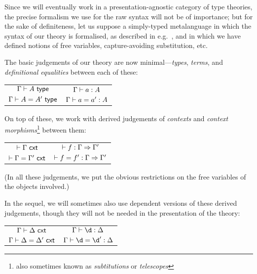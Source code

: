 \begin{para}
Since we will eventually work in a presentation-agnostic category of type theories, the precise formalism we use for the raw syntax will not be of importance; but for the sake of definiteness, let us suppose a simply-typed metalanguage in which the syntax of our theory is formalised, as described in e.g.\ \cite[6.1]{pitts:categorial-logic}, and in which we have defined notions of free variables, capture-avoiding substitution, etc.

The basic judgements of our theory are now minimal---\emph{types}, \emph{terms}, and \emph{definitional equalities} between each of these:
\end{para}
\begin{center}\begin{tabular}{@{\ }c@{\hskip 0.75in}c@{\ }}
$\Gamma \vdash A \ \mathsf{type} $ & $ \Gamma \vdash a:A $ \\ \rule{0pt}{3ex} 
$\Gamma \vdash A = A' \ \mathsf{type} $& $ \Gamma \vdash a = a' : A $ \\
\end{tabular}
\end{center}

On top of these, we work with derived judgements of \emph{contexts} and \emph{context morphisms}\footnote{also sometimes known as \emph{subtitutions} or \emph{telescopes}} between them:
\begin{center}\begin{tabular}{@{\ }c@{\hskip 0.75in}c@{\ }}
$\vdash \Gamma \ \mathsf{cxt}$ & $ \vdash  f : \Gamma \Rightarrow \Gamma' $  \\ \rule{0pt}{3ex} 
$\vdash \Gamma = \Gamma' \ \mathsf{cxt}$ &  $\vdash { f} = { f}' : \Gamma \Rightarrow \Gamma'$ \\
\end{tabular}
\end{center}

(In all these judgements, we put the obvious restrictions on the free variables of the objects involved.)

In the sequel, we will sometimes also use dependent versions of these derived judgements, though they will not be needed in the presentation of the theory:
\begin{center}\begin{tabular}{@{\ }c@{\hskip 0.75in}c@{\ }}
$ \Gamma \vdash \Delta \ \mathsf{cxt}$ & $\Gamma \types \d : \Delta $  \\ \rule{0pt}{3ex} 
$ \Gamma \vdash \Delta = \Delta' \ \mathsf{cxt}$ & $\Gamma \types \d = \d' : \Delta$ \\
\end{tabular}
\end{center}

